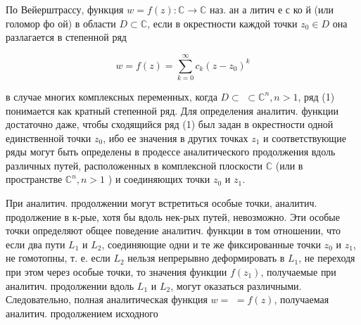 \documentclass[10pt]{article}
\begin{document}
По Вейерштрассу, функция $w=f(z): \mathbb{C} \rightarrow \mathbb{C}$ наз. ан а литич е с ко й (или голомор фо ой) в области $D \subset \mathbb{C}$, если в окрестности каждой точки $z_{0} \in D$ она разлагается в степенной ряд



\[

w=f(z)=\sum_{k=0}^{\infty} c_{k}\left(z-z_{0}\right)^{k}

\]



в случае многих комплексных переменных, когда $D \subset$ $\subset \mathbb{C}^{n}, n>1$, ряд (1) понимается как кратный степенной ряд. Для определения аналитич. функции достаточно даже, чтобы сходящийся ряд (1) был задан в окрестности одной единственной точки $z_{0}$, ибо ее значения в других точках $z_{1}$ и соответствующие ряды могут быть определены в продессе аналитического продолжения вдоль различных путей, расположенных в комплексной плоскости $\mathbb{C}$ (или в пространстве $\mathbb{C}^{n}, n>1$ ) и соединяющих точки $z_{0}$ и $z_{1}$.



При аналитич. продолжении могут встретиться особые точки, аналитич. продолжение в к-рые, хотя бы вдоль нек-рых путей, невозможно. Эти особые точки определяют общее поведение аналитич. функции в том отношении, что если два пути $L_{1}$ и $L_{2}$, соединяющие одни и те же фиксированные точки $z_{0}$ и $z_{1}$, не гомотопны, т. е. если $L_{2}$ нельзя непрерывно деформировать в $L_{1}$, не переходя при этом через особые точки, то значения функции $f\left(z_{1}\right)$, получаемые при аналитич. продолжении вдоль $L_{1}$ и $L_{2}$, могут оказаться различными. Следовательно, полная аналитическая функция $w=$ $=f(z)$, получаемая аналитич. продолжением исходного
\end{document}
